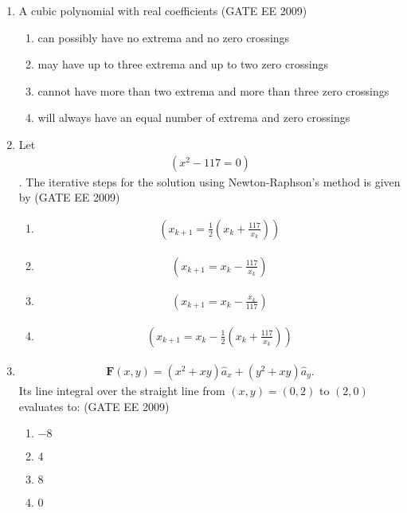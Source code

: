 \documentclass[journal,12pt,onecolumn]{IEEEtran}
\theoremstyle{remark}
\begin{document}
\begin{flushleft}
\begin{enumerate}
\item A cubic polynomial with real coefficients
\hfill(GATE EE 2009)
\begin{enumerate}
    \item can possibly have no extrema and no zero crossings
    \item may have up to three extrema and up to two zero crossings
    \item cannot have more than two extrema and more than three zero crossings
    \item will always have an equal number of extrema and zero crossings
\end{enumerate}


\item Let 
\begin{align*}
(x^{2} - 117 = 0)
\end{align*}. 
The iterative steps for the solution using Newton-Raphson's method is given by
\hfill(GATE EE 2009)
\begin{enumerate}
      \item
   \begin{align*}
     (x_{k+1} = \frac{1}{2} \left(x_k + \frac{117}{x_k}\right))
    \end{align*}
    \item 
  \begin{align*}
       (x_{k+1} = x_k - \frac{117}{x_k})
       \end{align*}
       \item
  \begin{align*}
    (x_{k+1} = x_k - \frac{x_k}{117})
    \end{align*}
   \item
   \begin{align*}
        (x_{k+1} = x_k - \frac{1}{2} \left(x_k + \frac{117}{x_k}\right))
        \end{align*}
\end{enumerate}

\item \begin{align*}
\mathbf{F}(x,y) = (x^{2} + xy) \hat{a}_x + (y^{2} + xy) \hat{a}_y.
\end{align*}
Its line integral over the straight line from \((x,y) = (0,2)\) to \((2,0)\) evaluates to:
\hfill(GATE EE 2009)
\begin{enumerate}
    \item $-8$
    \item $4$
    \item $8$
    \item $0$
\end{enumerate}




\end{enumerate}
\end{flushleft}
\end{document}
